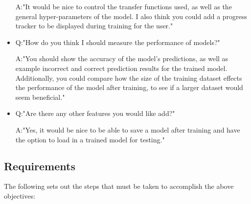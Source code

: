 \documentclass[./project-report/src/latex/project-report.tex]{subfiles}
\begin{document}
\begin{itemize}
          A:"It would be nice to control the transfer functions used, as well as the general hyper-parameters of the model. I also think you could add a progress tracker 
             to be displayed during training for the user."
    \item Q:"How do you think I should measure the performance of models?"

          A:"You should show the accuracy of the model's predictions, as well as example incorrect and correct prediction results for the trained model. Additionally, 
             you could compare how the size of the training dataset effects the performance of the model after training, to see if a larger dataset would seem 
             beneficial."
    \item Q:"Are there any other features you would like add?"

          A:"Yes, it would be nice to be able to save a model after training and have the option to load in a trained model for testing."
\end{itemize}

\subsection{Requirements}

The following sets out the steps that must be taken to accomplish the above objectives:
\end{document}
